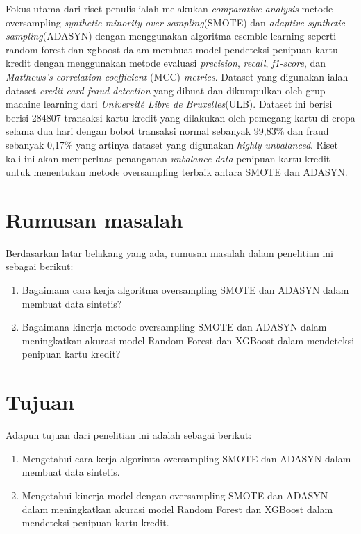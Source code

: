 Fokus utama dari riset penulis ialah melakukan \textit{comparative analysis} metode oversampling \textit{synthetic minority over-sampling}(SMOTE) dan \textit{adaptive synthetic sampling}(ADASYN) dengan menggunakan algoritma esemble learning seperti random forest dan xgboost dalam membuat model pendeteksi penipuan kartu kredit dengan menggunakan metode evaluasi \textit{precision}, \textit{recall}, \textit{f1-score}, dan \textit{Matthews’s correlation coefficient} (MCC) \textit{metrics}. Dataset yang digunakan ialah dataset \textit{credit card fraud detection} yang dibuat dan dikumpulkan oleh grup machine learning dari \textit{Université Libre de Bruxelles}(ULB)\cite{dal2015calibrating}. Dataset ini berisi berisi 284807 transaksi kartu kredit yang dilakukan oleh pemegang kartu di  eropa  selama  dua  hari  dengan bobot  transaksi  normal  sebanyak  99,83\%  dan  fraud  sebanyak  0,17\% yang artinya dataset yang digunakan \textit{highly unbalanced}\cite{WinNT}. Riset kali ini akan memperluas penanganan \textit{unbalance data} penipuan kartu kredit untuk menentukan metode oversampling terbaik antara SMOTE dan ADASYN.
\section{Rumusan masalah} \label{I.Rumusan Masalah}
Berdasarkan latar belakang yang ada, rumusan masalah dalam penelitian ini sebagai berikut:

\begin{enumerate}[noitemsep]
        \item Bagaimana cara kerja algoritma oversampling SMOTE dan ADASYN dalam membuat data sintetis?
        \item Bagaimana kinerja metode oversampling SMOTE dan ADASYN dalam meningkatkan akurasi model Random Forest dan XGBoost dalam mendeteksi penipuan kartu kredit?
\end{enumerate}

\section{Tujuan} \label{I.Tujuan}
Adapun tujuan dari penelitian ini adalah sebagai berikut:
\begin{enumerate}[noitemsep]
        \item Mengetahui cara kerja algorimta oversampling SMOTE dan ADASYN dalam membuat data sintetis.
        \item Mengetahui kinerja model dengan oversampling SMOTE dan ADASYN dalam meningkatkan akurasi model Random Forest dan XGBoost dalam mendeteksi penipuan kartu kredit.
\end{enumerate}

